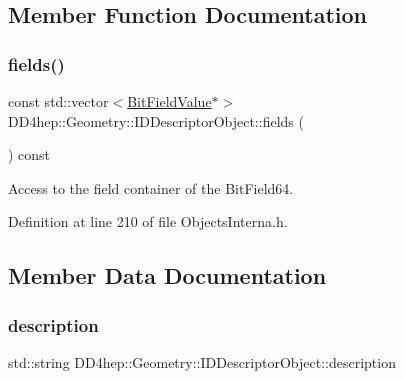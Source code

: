 \subsection{Member Function Documentation}
\hypertarget{class_d_d4hep_1_1_geometry_1_1_i_d_descriptor_object_a303d86365e897cb475140b1dbadd7ee4}{}\label{class_d_d4hep_1_1_geometry_1_1_i_d_descriptor_object_a303d86365e897cb475140b1dbadd7ee4} 
\subsubsection{\texorpdfstring{fields()}{fields()}}
{\footnotesize\ttfamily const std\+::vector$<$\hyperlink{class_d_d4hep_1_1_d_d_segmentation_1_1_bit_field_value}{Bit\+Field\+Value}$\ast$$>$ D\+D4hep\+::\+Geometry\+::\+I\+D\+Descriptor\+Object\+::fields (\begin{DoxyParamCaption}{ }\end{DoxyParamCaption}) const\hspace{0.3cm}{\ttfamily [inline]}}



Access to the field container of the Bit\+Field64. 



Definition at line 210 of file Objects\+Interna.\+h.



\subsection{Member Data Documentation}
\hypertarget{class_d_d4hep_1_1_geometry_1_1_i_d_descriptor_object_a2f745060e365a31cb36186dacf26204c}{}\label{class_d_d4hep_1_1_geometry_1_1_i_d_descriptor_object_a2f745060e365a31cb36186dacf26204c} 
\subsubsection{\texorpdfstring{description}{description}}
{\footnotesize\ttfamily std\+::string D\+D4hep\+::\+Geometry\+::\+I\+D\+Descriptor\+Object\+::description}



